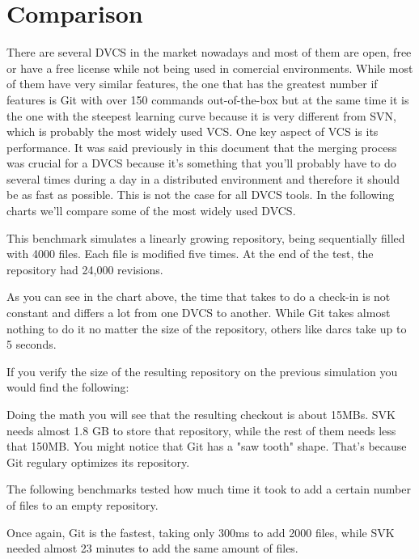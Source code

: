 \section{Comparison}
There are several DVCS in the market nowadays and most of them are open, free or have a free license while not being used in comercial environments. While most of them have very similar features, the one that has the greatest number if features is Git with over 150 commands out-of-the-box but at the same time it is the one with the steepest learning curve because it is very different from SVN, which is probably the most widely used VCS. 
One key aspect of VCS is its performance. It was said previously in this document that the merging process was crucial for a DVCS because it's something that you'll probably have to do several times during a day in a distributed environment and therefore it should be as fast as possible. This is not the case for all DVCS tools. In the following charts\cite{dvcsperfcomparison} we'll compare some of the most widely used DVCS. 

This benchmark simulates a linearly growing repository, being sequentially filled with 4000 files. Each file is modified five times. At the end of the test, the repository had 24,000 revisions. 


As you can see in the chart above, the time that takes to do a check-in is not constant and differs a lot from one DVCS to another. While Git takes almost nothing to do it no matter the size of the repository, others like darcs take up to 5 seconds.

If you verify the size of the resulting repository on the previous simulation you would find the following:


Doing the math you will see that the resulting checkout is about 15MBs. SVK needs almost 1.8 GB to store that repository, while the rest of them needs less that 150MB. You might notice that Git has a "saw tooth" shape. That's because Git regulary optimizes its repository. 

The following benchmarks tested how much time it took to add a certain number of files to an empty repository. 


Once again, Git is the fastest, taking only 300ms to add 2000 files, while SVK needed almost 23 minutes to add the same amount of files. 

